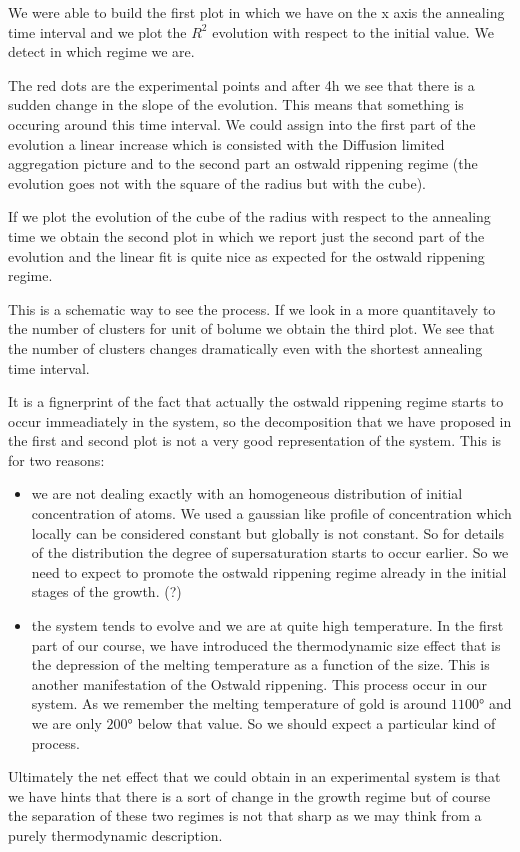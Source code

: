 \documentclass[../main/main.tex]{subfiles}
\begin{document}
We were able to build the first plot in which we have on the x axis the annealing time interval and we plot the \( R^2 \) evolution with respect to the initial value. We detect in which regime we are.

The red dots are the experimental points and after 4h we see that there is a sudden change in the slope of the evolution. This means that something is occuring around this time interval. We could assign into the first part of the evolution a linear increase which is consisted with the Diffusion limited aggregation picture and to the second part an ostwald rippening regime (the evolution goes not with the square of the radius but with the cube).

If we plot the evolution of the cube of the radius with respect to the annealing time we obtain the second plot in which we report just the second part of the evolution and the linear fit is quite nice as expected for the ostwald rippening regime.

This is a schematic way to see the process. If we look in a more quantitavely to the number of clusters for unit of bolume we obtain the third plot. We see that the number of clusters changes dramatically even with the shortest annealing time interval.

It is a fignerprint of the fact that actually the ostwald rippening regime starts to occur immeadiately in the system, so the decomposition that we have proposed in the first and second plot is not a very good representation of the system. This is for two reasons:
\begin{itemize}
\item we are not dealing exactly with an homogeneous distribution of initial concentration of atoms. We used a gaussian like profile of concentration which locally can be considered constant but globally is not constant. So for details of the distribution the degree of supersaturation starts to occur earlier. So we need to expect to promote the ostwald rippening regime already in the initial stages of the growth. (?)

\item the system tends to evolve and we are at quite high temperature. In the first part of our course, we have introduced the thermodynamic size effect that is the depression of the melting temperature as a function of the size. This is another manifestation of the Ostwald rippening. This process occur in our system. As we remember the melting temperature of gold is around \( 1100° \) and we are only \( 200° \) below that value. So we should expect a particular kind of process.
\end{itemize}
Ultimately the net effect that we could obtain in an experimental system is that we have hints that there is a sort of change in the growth regime but of course the separation of these two regimes is not that sharp as we may think from a purely thermodynamic description.
\end{document}
